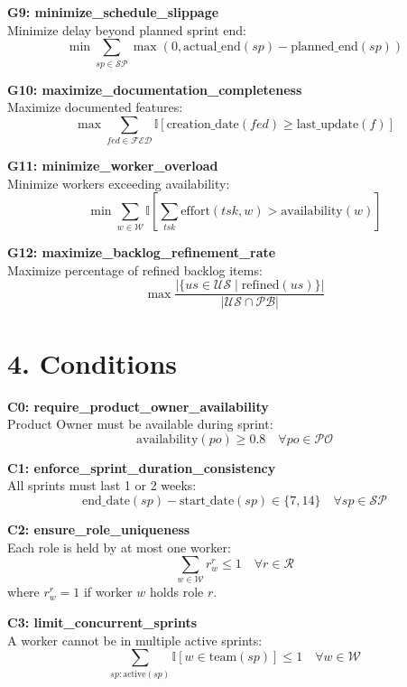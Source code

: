 \documentclass[12pt]{article}
\begin{document}
    \item \textbf{G9: minimize\_schedule\_slippage} \\
    Minimize delay beyond planned sprint end:
    \[
    \min \sum_{sp \in \mathcal{SP}} \max(0, \text{actual\_end}(sp) - \text{planned\_end}(sp))
    \]

    \item \textbf{G10: maximize\_documentation\_completeness} \\
    Maximize documented features:
    \[
    \max \sum_{fed \in \mathcal{FED}} \mathbb{I}[\text{creation\_date}(fed) \geq \text{last\_update}(f)]
    \]

    \item \textbf{G11: minimize\_worker\_overload} \\
    Minimize workers exceeding availability:
    \[
    \min \sum_{w \in \mathcal{W}} \mathbb{I}\left[ \sum_{tsk} \text{effort}(tsk,w) > \text{availability}(w) \right]
    \]

    \item \textbf{G12: maximize\_backlog\_refinement\_rate} \\
    Maximize percentage of refined backlog items:
    \[
    \max \frac{ |\{ us \in \mathcal{US} \mid \text{refined}(us) \}| }{ |\mathcal{US} \cap \mathcal{PB}| }
    \]

\section{4. Conditions}
\item \textbf{C0: require\_product\_owner\_availability} \\
    Product Owner must be available during sprint:
    \[
    \text{availability}(po) \geq 0.8 \quad \forall po \in \mathcal{PO}
    \]

    \item \textbf{C1: enforce\_sprint\_duration\_consistency} \\
    All sprints must last 1 or 2 weeks:
    \[
    \text{end\_date}(sp) - \text{start\_date}(sp) \in \{7, 14\} \quad \forall sp \in \mathcal{SP}
    \]

    \item \textbf{C2: ensure\_role\_uniqueness} \\
    Each role is held by at most one worker:
    \[
    \sum_{w \in \mathcal{W}} r_w^r \leq 1 \quad \forall r \in \mathcal{R}
    \]
    where $ r_w^r = 1 $ if worker $ w $ holds role $ r $.

    \item \textbf{C3: limit\_concurrent\_sprints} \\
    A worker cannot be in multiple active sprints:
    \[
    \sum_{sp: \text{active}(sp)} \mathbb{I}[w \in \text{team}(sp)] \leq 1 \quad \forall w \in \mathcal{W}
    \]
\end{document}
